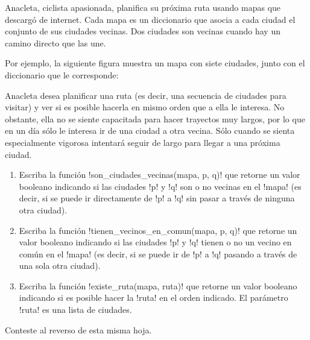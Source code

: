 Anacleta, ciclista apasionada,
planifica su próxima ruta
usando mapas que descargó de internet.
Cada mapa es un diccionario
que asocia a cada ciudad
el conjunto de sus ciudades vecinas.
Dos ciudades son vecinas
cuando hay un camino directo que las une.

Por ejemplo,
la siguiente figura muestra un mapa con siete ciudades,
junto con el diccionario que le corresponde:

\begin{minipage}[T]{.45\textwidth}
\end{minipage}
\hfil
\begin{minipage}[T]{.45\textwidth}
  
\end{minipage}

Anacleta desea planificar una ruta
(es decir, una secuencia de ciudades para visitar)
y ver si es posible hacerla en mismo orden que a ella le interesa.
No obstante,
ella no se siente capacitada para hacer trayectos muy largos,
por lo que en un día sólo le interesa ir de una ciudad a otra vecina.
Sólo cuando se sienta especialmente vigorosa
intentará seguir de largo para llegar a una próxima ciudad.

\begin{enumerate}[leftmargin=0pt,label=\emph{\alph*})]
  \item
    Escriba la función \li!son_ciudades_vecinas(mapa, p, q)!
    que retorne un valor booleano
    indicando si las ciudades \li!p! y \li!q!
    son o no vecinas en el \li!mapa!
    (es decir, si se puede ir directamente de \li!p! a \li!q!
    sin pasar a través de ninguna otra ciudad).
    
  \item
    Escriba la función \li!tienen_vecinos_en_comun(mapa, p, q)!
    que retorne un valor booleano
    indicando si las ciudades \li!p! y \li!q!
    tienen o no un vecino en común en el \li!mapa!
    (es decir, si se puede ir de \li!p! a \li!q!
    pasando a través de una sola otra ciudad).
    
  \item
    Escriba la función \li!existe_ruta(mapa, ruta)!
    que retorne un valor booleano
    indicando si es posible hacer la \li!ruta! en el orden indicado.
    El parámetro \li!ruta! es una lista de ciudades.
    
\end{enumerate}

Conteste al reverso de esta misma hoja.

